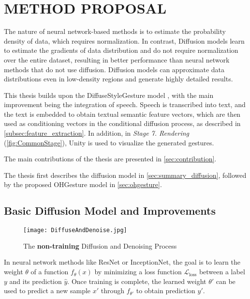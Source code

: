 \chapter{METHOD PROPOSAL}
\label{chap:Chapter3}

The nature of neural network-based methods is to estimate the probability density of data, which requires normalization. In contrast, Diffusion models learn to estimate the gradients of data distribution \cite{song2021score} and do not require normalization over the entire dataset, resulting in better performance than neural network methods that do not use diffusion. Diffusion models can approximate data distributions even in low-density regions and generate highly detailed results.

This thesis builds upon the DiffuseStyleGesture model \cite{yang2022DiffuseStyleGestureplus}, with the main improvement being the integration of speech. Speech is transcribed into text, and the text is embedded to obtain textual semantic feature vectors, which are then used as conditioning vectors in the conditional diffusion process, as described in \autoref{subsec:feature_extraction}. In addition, in \textit{Stage 7. Rendering} (\autoref{fig:CommonStage}), Unity is used to visualize the generated gestures.

The main contributions of the thesis are presented in \autoref{sec:contribution}.

The thesis first describes the diffusion model in \autoref{sec:summary_diffusion}, followed by the proposed OHGesture model in \autoref{sec:ohgesture}.

\pagebreak

\section{Basic Diffusion Model and Improvements}
\label{sec:summary_diffusion}

\begin{figure}[h]
	\centering
	\texttt{[image: DiffuseAndDenoise.jpg]}
	\caption{The \textbf{non-training} Diffusion and Denoising Process}
	\label{fig:DiffuseAndDenoise}
\end{figure}

In neural network methods like ResNet or InceptionNet, the goal is to learn the weight $\theta$ of a function $f_{\theta}(x)$ by minimizing a loss function $\mathcal{L}_\text{loss}$ between a label $y$ and its prediction $\hat{y}$. Once training is complete, the learned weight $\theta'$ can be used to predict a new sample $x'$ through $f_{\theta'}$ to obtain prediction $y'$.


